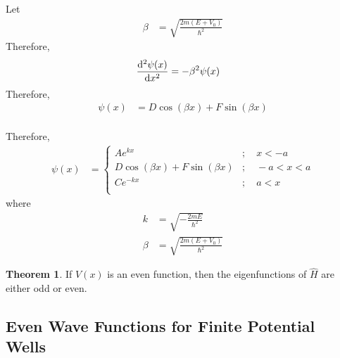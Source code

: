 \documentclass[titlepage, fleqn, a4paper, 12pt, twoside]{article}
\theoremstyle{definition}
\theoremstyle{theorem}
\newtheorem{theorem}{Theorem}
\begin{document}
Let
\begin{align*}
	\beta &= \sqrt{\frac{2 m (E + V_0)}{\hbar^2}}
\end{align*}
Therefore,
\begin{align*}
	\dod[2]{\psi(x)}{x} &= -\beta^2 \psi(x)
\end{align*}
Therefore,
\begin{align*}
	\psi(x) &= D \cos(\beta x) + F \sin(\beta x)
\end{align*}
~\\
Therefore,
\begin{align*}
	\psi(x) &=
		\begin{cases}
			A e^{k x} &;\quad x < -a\\
			D \cos(\beta x) + F \sin(\beta x) &;\quad -a < x < a\\
			C e^{-k x} &;\quad a < x\\
		\end{cases}
\end{align*}
where
\begin{align*}
	k &= \sqrt{-\frac{2 m E}{\hbar^2}}\\
	\beta &= \sqrt{\frac{2 m (E + V_0)}{\hbar^2}}
\end{align*}

\begin{theorem}
	If $V(x)$ is an even function, then the eigenfunctions of $\hat{H}$ are either odd or even.
\end{theorem}

\subsection{Even Wave Functions for Finite Potential Wells}
\end{document}

